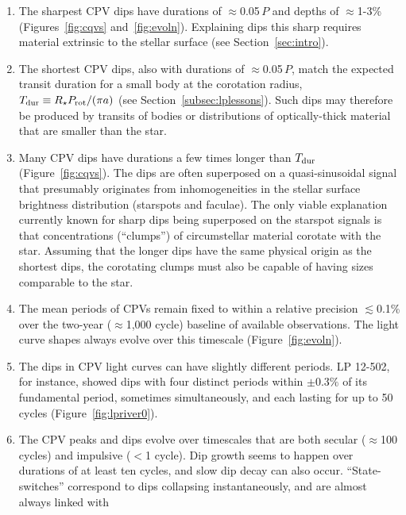 \documentclass[11pt,twocolumn,tighten]{aastex63}
\begin{document}
\begin{enumerate}[leftmargin=*]
%
    \item The sharpest CPV dips have durations of $\approx$0.05\,$P$
      and depths of $\approx$1-3\% (Figures~\ref{fig:cqvs}
      and~\ref{fig:evoln}).  Explaining dips this sharp requires
      material extrinsic to the stellar surface (see
      Section~\ref{sec:intro}).
%
    \item The shortest CPV dips, also with durations of
      $\approx$0.05\,$P$, match the expected transit duration for a
      small body at the corotation radius, $T_{\rm dur} \equiv R_\star
      P_{\rm rot} / (\pi a)$ (see Section~\ref{subsec:lplessons}).
      Such dips may therefore be produced by transits of bodies or
      distributions of optically-thick material that are smaller than
      the star.
%
    \item Many CPV dips have durations a few times longer than $T_{\rm
      dur}$ (Figure~\ref{fig:cqvs}).  The dips are often superposed
      on a quasi-sinusoidal signal that presumably originates from
      inhomogeneities in the stellar surface brightness
      distribution (starspots and faculae).  The
      only viable explanation currently known for sharp dips being superposed on
      the starspot signals is that concentrations (``clumps'')
      of circumstellar material corotate with the star.
      Assuming that the longer dips have the same physical origin as
      the shortest dips, the corotating clumps must also
      be capable of having sizes comparable to the star.
%
    \item The mean periods of CPVs remain fixed to within a relative
      precision $\lesssim$0.1\% over the two-year ($\approx$1{,}000
      cycle) baseline of available observations.  The light curve
      shapes always evolve over this timescale
      (Figure~\ref{fig:evoln}).
%
    \item The dips in CPV light curves can have slightly different
      periods.  LP 12-502, for instance, showed dips with four
      distinct periods within $\pm 0.3\%$ of its fundamental period,
      sometimes simultaneously, and each lasting for up to 50 cycles
      (Figure~\ref{fig:lpriver0}).
%
    \item The CPV peaks and dips evolve over timescales that are both secular
      ($\approx$100\,cycles) and impulsive ($<$1 cycle).  Dip growth seems
      to happen over durations of at least ten cycles, and slow dip
      decay can also occur.  ``State-switches'' correspond to dips 
      collapsing instantaneously, and are almost always linked with

\end{enumerate}
\end{document}
